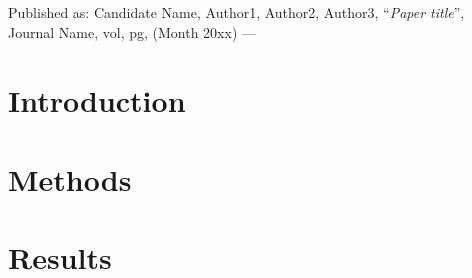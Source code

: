 {Published as: 
\textnormal{{\color{denimdarkblue} Candidate Name}, 
Author1, Author2, Author3, 
``\emph{Paper title}'',
Journal Name,} vol, 
\textnormal{pg, (Month 20xx) --- \cite{TestArticle-2022-ARAA}}
}
\label{chap:p1-rotation-coupling}

\section{Introduction} \label{sec:p1-intro}
\lipsum[1-6]

\section{Methods} \label{sec:p1-methods}
\lipsum[1-6]

\section{Results} \label{sec:p1-results}
\lipsum[1-6]
